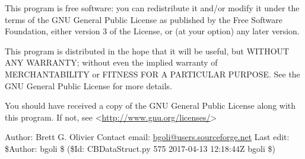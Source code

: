 \documentclass[a4paper,11pt,english]{sphinxmanual}
\begin{document}
This program is free software: you can redistribute it and/or modify
it under the terms of the GNU General Public License as published by
the Free Software Foundation, either version 3 of the License, or
(at your option) any later version.

This program is distributed in the hope that it will be useful,
but WITHOUT ANY WARRANTY; without even the implied warranty of
MERCHANTABILITY or FITNESS FOR A PARTICULAR PURPOSE.  See the
GNU General Public License for more details.

You should have received a copy of the GNU General Public License
along with this program.  If not, see \textless{}\url{http://www.gnu.org/licenses/}\textgreater{}

Author: Brett G. Olivier
Contact email: \href{mailto:bgoli@users.sourceforge.net}{bgoli@users.sourceforge.net}
Last edit: \$Author: bgoli \$ (\$Id: CBDataStruct.py 575 2017-04-13 12:18:44Z bgoli \$)
\end{document}
